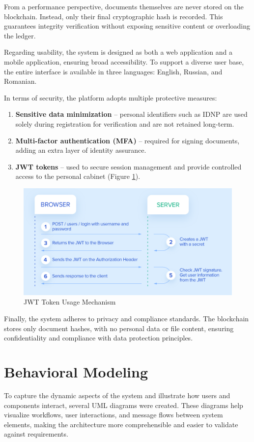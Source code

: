 From a performance perspective, documents themselves are never stored on the blockchain. Instead, only their final cryptographic hash is recorded. This guarantees integrity verification without exposing sensitive content or overloading the ledger.

Regarding usability, the system is designed as both a web application and a mobile application, ensuring broad accessibility. To support a diverse user base, the entire interface is available in three languages: English, Russian, and Romanian.

In terms of security, the platform adopts multiple protective measures:
\begin{enumerate}
    \item \textbf{Sensitive data minimization} – personal identifiers such as IDNP are used solely during registration for verification and are not retained long-term.
    \item \textbf{Multi-factor authentication (MFA)} – required for signing documents, adding an extra layer of identity assurance.
    \item \textbf{JWT tokens} – used to secure session management and provide controlled access to the personal cabinet (Figure \ref{jwt-mechanism}).
\end{enumerate}

\begin{figure}[H]
    \centering
    \includegraphics[width=18cm]{"images/jwt-mechanism.png"}
    \caption{JWT Token Usage Mechanism}
    \label{jwt-mechanism}
\end{figure}

Finally, the system adheres to privacy and compliance standards. The blockchain stores only document hashes, with no personal data or file content, ensuring confidentiality and compliance with data protection principles.


\section{Behavioral Modeling}
To capture the dynamic aspects of the system and illustrate how users and components interact, several UML diagrams were created. These diagrams help visualize workflows, user interactions, and message flows between system elements, making the architecture more comprehensible and easier to validate against requirements.

